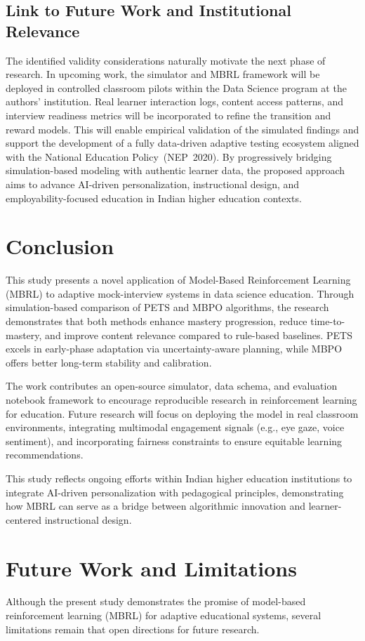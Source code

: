 \documentclass[preprint,12pt]{elsarticle}
\begin{document}
\begin{frontmatter}
\subsection*{Link to Future Work and Institutional Relevance}
The identified validity considerations naturally motivate the next phase of research.  
In upcoming work, the simulator and MBRL framework will be deployed in controlled classroom pilots within the Data Science program at the authors’ institution.  
Real learner interaction logs, content access patterns, and interview readiness metrics will be incorporated to refine the transition and reward models.  
This will enable empirical validation of the simulated findings and support the development of a fully data-driven adaptive testing ecosystem aligned with the National Education Policy~(NEP~2020).  
By progressively bridging simulation-based modeling with authentic learner data, the proposed approach aims to advance AI-driven personalization, instructional design, and employability-focused education in Indian higher education contexts.


\section{Conclusion}
This study presents a novel application of Model-Based Reinforcement Learning (MBRL) to adaptive mock-interview systems in data science education. Through simulation-based comparison of PETS and MBPO algorithms, the research demonstrates that both methods enhance mastery progression, reduce time-to-mastery, and improve content relevance compared to rule-based baselines. PETS excels in early-phase adaptation via uncertainty-aware planning, while MBPO offers better long-term stability and calibration.

The work contributes an open-source simulator, data schema, and evaluation notebook framework to encourage reproducible research in reinforcement learning for education. Future research will focus on deploying the model in real classroom environments, integrating multimodal engagement signals (e.g., eye gaze, voice sentiment), and incorporating fairness constraints to ensure equitable learning recommendations.

This study reflects ongoing efforts within Indian higher education institutions to integrate AI-driven personalization with pedagogical principles, demonstrating how MBRL can serve as a bridge between algorithmic innovation and learner-centered instructional design.

\section{Future Work and Limitations}
Although the present study demonstrates the promise of model-based reinforcement learning (MBRL) for adaptive educational systems, several limitations remain that open directions for future research.


\end{frontmatter}
\end{document}
